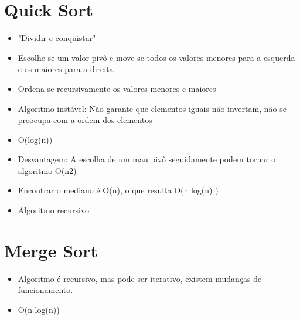 \documentclass{article}
\begin{document}
\section{Quick Sort}
	\begin{itemize}
	\item "Dividir e conquistar"
	\item Escolhe-se um valor pivô e move-se todos os valores menores para a esquerda e os maiores para a direita
	\item Ordena-se recursivamente os valores menores e maiores
	\item Algoritmo instável: Não garante que elementos iguais não invertam, não se preocupa com a ordem dos elementos
	\item O(log(n))
	\item Desvantagem: A escolha de um mau pivô seguidamente podem tornar o algoritmo O(n2)
	\item Encontrar o mediano é O(n), o que resulta O(n log(n) ) 
	\item Algoritmo recursivo
	\end{itemize}

\section{Merge Sort}
	\begin{itemize}
	\item Algoritmo é recursivo, mas pode ser iterativo, existem mudanças de funcionamento.
	\item O(n log(n))
	\end{itemize}
\end{document}
